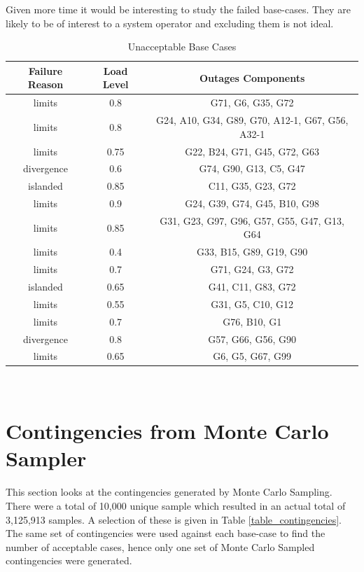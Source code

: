 \documentclass[a4paper,oneside,12pt]{report}
\begin{document}
Given more time it would be interesting to study the failed base-cases. They are likely to be of interest to a system operator and excluding them is not ideal.

\begin{table}[htbp]
\caption{Unacceptable Base Cases}
\label{table_unacceptable_base_cases}
\centering
\begin{tabular}{c||c||c}
\bfseries Failure Reason & \bfseries Load Level & \bfseries Outages Components \\
\hline \hline
limits &  0.8  &  G71, G6, G35, G72  \\ 
limits &  0.8  &  G24, A10, G34, G89, G70, A12-1, G67, G56, A32-1 \\ 
limits &  0.75 &  G22, B24, G71, G45, G72, G63 \\ 
divergence              &  0.6  &  G74, G90, G13, C5, G47 \\ 
islanded                &  0.85 &  C11, G35, G23, G72 \\ 
limits &  0.9  &  G24, G39, G74, G45, B10, G98 \\ 
limits &  0.85 &  G31, G23, G97, G96, G57, G55, G47, G13, G64 \\ 
limits &  0.4  &  G33, B15, G89, G19, G90 \\ 
limits &  0.7  &  G71, G24, G3, G72 \\ 
islanded                &  0.65 &  G41, C11, G83, G72 \\ 
limits &  0.55 &  G31, G5, C10, G12 \\ 
limits &  0.7  &  G76, B10, G1 \\ 
divergence              &  0.8  &  G57, G66, G56, G90 \\ 
limits &  0.65 &  G6, G5, G67, G99 \\ 
\hline
\end{tabular}\\
\end{table}

\section{Contingencies from Monte Carlo Sampler}

This section looks at the contingencies generated by Monte Carlo Sampling. There were a total of 10,000 unique sample which resulted in an actual total of 3,125,913 samples. A selection of these is given in Table \ref{table_contingencies}. The same set of contingencies were used against each base-case to find the number of acceptable cases, hence only one set of Monte Carlo Sampled contingencies were generated.
\end{document}
